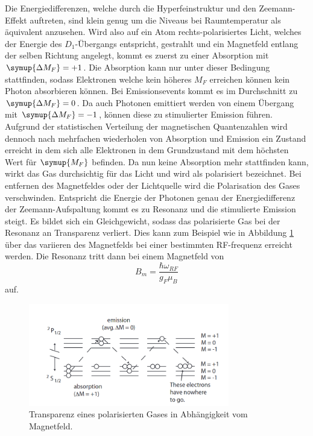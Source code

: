 Die Energiedifferenzen, welche durch die Hyperfeinstruktur und den Zeemann-Effekt auftreten, sind klein genug um die Niveaus bei Raumtemperatur als äquivalent anzusehen.
Wird also auf ein Atom rechts-polarisiertes Licht, welches der Energie des $D_1$-Übergangs entspricht, gestrahlt und ein Magnetfeld entlang der selben Richtung angelegt, kommt es zuerst zu einer Absorption mit $\symup{\Delta{M_F}} = +1$.
Die Absorption kann nur unter dieser Bedingung stattfinden, sodass Elektronen welche kein höheres $M_F$ erreichen können kein Photon absorbieren können.
Bei Emissionsevents kommt es im Durchschnitt zu $\symup{\Delta{M_F}} = 0$. Da auch Photonen emittiert werden von einem Übergang mit $\symup{\Delta{M_F}} = -1$, können diese zu
stimulierter Emission führen. Aufgrund der statistischen Verteilung der magnetischen Quantenzahlen wird dennoch nach mehrfachen wiederholen von Absorption und Emission ein Zustand erreicht
in dem sich alle Elektronen in dem Grundzustand mit dem höchsten Wert für $\symup{M_F}$ befinden. Da nun keine Absorption mehr stattfinden kann, wirkt das Gas durchsichtig für das Licht und wird als polarisiert bezeichnet.
Bei entfernen des Magnetfeldes oder der Lichtquelle wird die Polarisation des Gases verschwinden. Entspricht die Energie der Photonen genau der Energiedifferenz der Zeemann-Aufspaltung kommt es zu
Resonanz und die stimulierte Emission steigt. Es bildet sich ein Gleichgewicht, sodass das polarisierte Gas bei der Resonanz an Transparenz verliert.
Dies kann zum Beispiel wie in Abbildung \ref{pic:resonanz} über das variieren des Magnetfelds bei einer bestimmten RF-frequenz erreicht werden. Die Resonanz tritt dann bei einem Magnetfeld von 
\begin{equation}
    B_m = \frac{\hbar \omega_{RF}}{g_F \mu_B}
    \label{eqn:magnetf}
\end{equation}
auf.
\begin{figure}
    \centering
    \includegraphics[width = 0.78\textwidth]{pics/pumpen.png}
    \caption{Transparenz eines polarisierten Gases in Abhängigkeit vom Magnetfeld.\cite{sample}}
    \label{pic:resonanz}
\end{figure}



